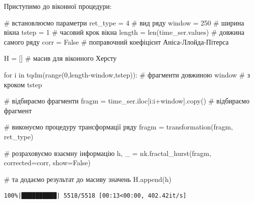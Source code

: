 \documentclass[
  letterpaper,
]{report}
\newenvironment{Shaded}{\begin{snugshade}}{\end{snugshade}}
\newcommand{\BuiltInTok}[1]{\textcolor[rgb]{0.00,0.23,0.31}{#1}}
\newcommand{\CommentTok}[1]{\textcolor[rgb]{0.37,0.37,0.37}{#1}}
\newcommand{\ControlFlowTok}[1]{\textcolor[rgb]{0.00,0.23,0.31}{#1}}
\newcommand{\DecValTok}[1]{\textcolor[rgb]{0.68,0.00,0.00}{#1}}
\newcommand{\KeywordTok}[1]{\textcolor[rgb]{0.00,0.23,0.31}{#1}}
\newcommand{\NormalTok}[1]{\textcolor[rgb]{0.00,0.23,0.31}{#1}}
\newcommand{\OperatorTok}[1]{\textcolor[rgb]{0.37,0.37,0.37}{#1}}
\newcommand{\VariableTok}[1]{\textcolor[rgb]{0.07,0.07,0.07}{#1}}
\begin{document}
Приступимо до віконної процедури:

\begin{Shaded}
\begin{Highlighting}[]
\CommentTok{\# встановлюємо параметри}
\NormalTok{ret\_type }\OperatorTok{=} \DecValTok{4}                   \CommentTok{\# вид ряду}
\NormalTok{window }\OperatorTok{=} \DecValTok{250}                   \CommentTok{\# ширина вікна}
\NormalTok{tstep }\OperatorTok{=} \DecValTok{1}                      \CommentTok{\# часовий крок вікна }
\NormalTok{length }\OperatorTok{=} \BuiltInTok{len}\NormalTok{(time\_ser.values)  }\CommentTok{\# довжина самого ряду}
\NormalTok{corr }\OperatorTok{=} \VariableTok{False}                   \CommentTok{\# поправочний коефіцієнт Аніса{-}Ллойда{-}Пітерса}

\NormalTok{H }\OperatorTok{=}\NormalTok{ []                         }\CommentTok{\# масив для віконного Херсту}
\end{Highlighting}
\end{Shaded}

\begin{Shaded}
\begin{Highlighting}[]
\ControlFlowTok{for}\NormalTok{ i }\KeywordTok{in}\NormalTok{ tqdm(}\BuiltInTok{range}\NormalTok{(}\DecValTok{0}\NormalTok{,length}\OperatorTok{{-}}\NormalTok{window,tstep)): }\CommentTok{\# фрагменти довжиною window  }
                                             \CommentTok{\# з кроком tstep}

    \CommentTok{\# відбираємо фрагменти}
\NormalTok{    fragm }\OperatorTok{=}\NormalTok{ time\_ser.iloc[i:i}\OperatorTok{+}\NormalTok{window].copy() }\CommentTok{\# відбираємо фрагмент  }

    \CommentTok{\# виконуємо процедуру трансформації ряду }
\NormalTok{    fragm }\OperatorTok{=}\NormalTok{ transformation(fragm, ret\_type)}

    \CommentTok{\# розраховуємо взаємну інформацію }
\NormalTok{    h, \_ }\OperatorTok{=}\NormalTok{ nk.fractal\_hurst(fragm, corrected}\OperatorTok{=}\NormalTok{corr, show}\OperatorTok{=}\VariableTok{False}\NormalTok{)}
    
    \CommentTok{\# та додаємо результат до масиву значень}
\NormalTok{    H.append(h)}
\end{Highlighting}
\end{Shaded}

\begin{verbatim}
100%|██████████| 5518/5518 [00:13<00:00, 402.42it/s]
\end{verbatim}
\end{document}
